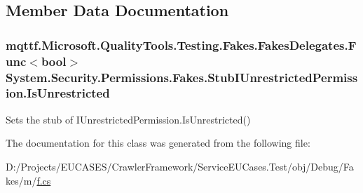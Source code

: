 \subsection{Member Data Documentation}
\hypertarget{class_system_1_1_security_1_1_permissions_1_1_fakes_1_1_stub_i_unrestricted_permission_ad5dd1fe5b0707ce25deef9049813467f}{
\subsubsection[{Is\-Unrestricted}]{\setlength{\rightskip}{0pt plus 5cm}mqttf.\-Microsoft.\-Quality\-Tools.\-Testing.\-Fakes.\-Fakes\-Delegates.\-Func$<$bool$>$ System.\-Security.\-Permissions.\-Fakes.\-Stub\-I\-Unrestricted\-Permission.\-Is\-Unrestricted}}\label{class_system_1_1_security_1_1_permissions_1_1_fakes_1_1_stub_i_unrestricted_permission_ad5dd1fe5b0707ce25deef9049813467f}


Sets the stub of I\-Unrestricted\-Permission.\-Is\-Unrestricted()



The documentation for this class was generated from the following file\-:\begin{DoxyCompactItemize}
\item 
D\-:/\-Projects/\-E\-U\-C\-A\-S\-E\-S/\-Crawler\-Framework/\-Service\-E\-U\-Cases.\-Test/obj/\-Debug/\-Fakes/m/\hyperlink{m_2f_8cs}{f.\-cs}\end{DoxyCompactItemize}
